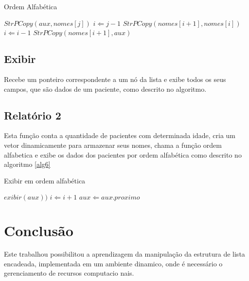 \documentclass[12pt]{article}
\begin{document}
\begin{algorithm}                      %
\caption{Ordem Alfabética}          %
\label{alg5}                           %
\begin{algorithmic}                    %
      \STATE $StrPCopy(aux, nomes[j])$
      \STATE $i \Leftarrow j-1$
        \STATE $StrPCopy(nomes[i+1], nomes[i])$
        \STATE $i \Leftarrow i -1$
      \ENDWHILE
      \STATE $StrPCopy(nomes[i+1], aux)$
    \ENDFOR
\end{algorithmic}
\end{algorithm}

\subsection{Exibir}

Recebe um ponteiro correspondente a um nó da lista e exibe todos os seus campos,
que são dados de um paciente, como descrito no algoritmo.


\subsection{Relatório 2}

Esta função conta a quantidade de pacientes com determinada idade, cria um vetor dinamicamente
para armazenar seus nomes, chama a função ordem alfabetica e exibe os dados dos pacientes por ordem
alfabética como descrito no algoritmo \ref{alg6}

\begin{algorithm}                      %
\caption{Exibir em ordem alfabética}          %
\label{alg6}                           %
\begin{algorithmic}
            \STATE $exibir(aux))$
            \STATE $i \Leftarrow i+1$
          \ENDIF
      \ENDWHILE
      \STATE $aux \Leftarrow aux\hat.proximo$
  \ENDWHILE
\end{algorithmic}
\end{algorithm}  



\section{Conclusão}

Este trabalhou possibilitou a aprendizagem da manipulação da estrutura de lista encadeada,
implementada em um ambiente dinamico, onde é necessário o gerenciamento de recursos computacio
nais.



\end{document}

